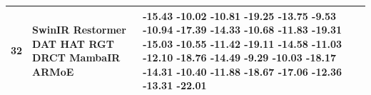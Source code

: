 \begin{tabular}{lll}
\toprule
32 & SwinIR Restormer DAT HAT RGT DRCT MambaIR ARMoE & -15.43 -10.02 -10.81 -19.25 -13.75 -9.53 -10.94 -17.39 -14.33 -10.68 -11.83 -19.31 -15.03 -10.55 -11.42 -19.11 -14.58 -11.03 -12.10 -18.76 -14.49 -9.29 -10.03 -18.17 -14.31 -10.40 -11.88 -18.67 -17.06 -12.36 -13.31 -22.01 \\
\midrule
\bottomrule
\end{tabular}
